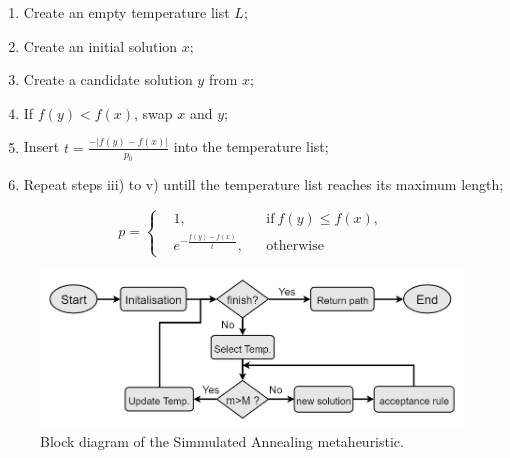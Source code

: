 
\begin{enumerate}[noitemsep,topsep=0pt,parsep=0pt,partopsep=0pt]
  \item Create an empty temperature list $L$;
  \item Create an initial solution $x$; 
  \item Create a candidate solution $y$ from $x$;
  \item If $f(y) < f(x)$, swap $x$ and $y$;
  \item Insert $t = \frac{-|f(y)-f(x)|}{p_0}$ into the temperature list;
  \item Repeat steps iii) to v) untill the temperature list reaches its maximum length;  
\end{enumerate}


\begin{equation}
\label{eq:metropolis_acceptance}
  p =  \left \{
  \begin{aligned}
    & 1, && \text{if}\ f(y) \leq f(x),\\
    & e^{-\frac{f(y)-f(x)}{t}},&& \text{otherwise}
  \end{aligned} \right. 
\end{equation}

\begin{figure}[H]
  \centering
  \includegraphics[width=\textwidth]{Figures/system_implementation/LBSA.png}
  \caption{Block diagram of the Simmulated Annealing metaheuristic.}
  \label{fig:LBSA}  
\end{figure}